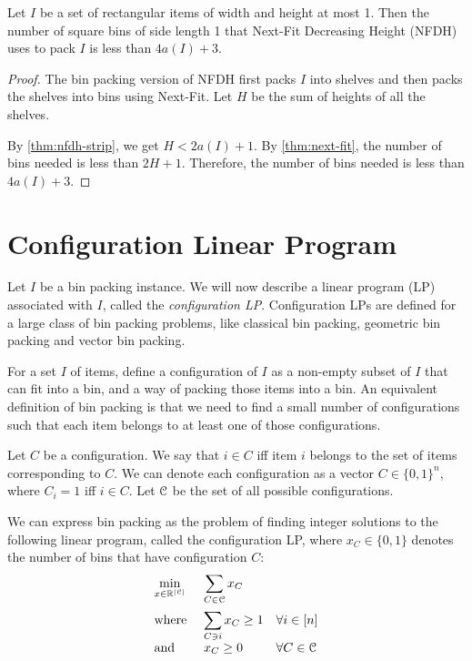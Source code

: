 \begin{lemma}
\label{thm:nfdh-bin}
Let $I$ be a set of rectangular items of width and height at most 1.
Then the number of square bins of side length 1 that
Next-Fit Decreasing Height (NFDH) uses to pack $I$ is less than $4a(I) + 3$.
\end{lemma}
\begin{proof}
The bin packing version of NFDH first packs $I$ into shelves
and then packs the shelves into bins using Next-Fit.
Let $H$ be the sum of heights of all the shelves.

By \cref{thm:nfdh-strip}, we get $H < 2a(I) + 1$.
By \cref{thm:next-fit}, the number of bins needed is less than $2H + 1$.
Therefore, the number of bins needed is less than $4a(I) + 3$.
\end{proof}

\section{Configuration Linear Program}
\label{sec:config-lp}

Let $I$ be a bin packing instance.
We will now describe a linear program (LP) associated with $I$,
called the \emph{configuration LP}.
Configuration LPs are defined for a large class of bin packing problems,
like classical bin packing, geometric bin packing and vector bin packing.

For a set $I$ of items, define a configuration of $I$ as a non-empty subset of $I$
that can fit into a bin, and a way of packing those items into a bin.
An equivalent definition of bin packing is that we need to find
a small number of configurations such that each item belongs to
at least one of those configurations.

Let $C$ be a configuration. We say that $i \in C$ iff
item $i$ belongs to the set of items corresponding to $C$.
We can denote each configuration as a vector $C \in \{0, 1\}^n$,
where $C_i = 1$ iff $i \in C$.
Let $\mathcal{C}$ be the set of all possible configurations.

We can express bin packing as the problem of finding integer solutions
to the following linear program, called the configuration LP,
where $x_C \in \{0, 1\}$ denotes the number of bins that have configuration $C$:
\[ \begin{array}{*3{>{\displaystyle}l}}
\min_{x \in \mathbb{R}^{|\Ccal|}} & \multicolumn{2}{>{\displaystyle}l}{\sum_{C \in \Ccal} x_C}
\\[1.5em] \textrm{where } & \sum_{C \ni i} x_C \ge 1 & \forall i \in [n]
\\[1em] \textrm{and } & x_C \ge 0 & \forall C \in \Ccal
\end{array} \]

